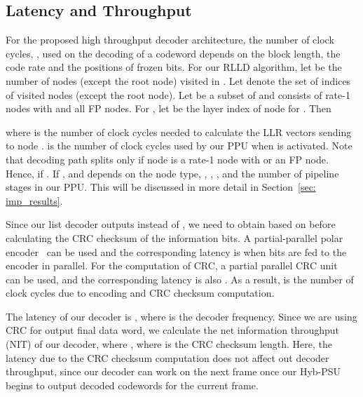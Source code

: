 \documentclass[journal]{IEEEtran}
\begin{document}
\subsection{Latency and Throughput} \label{ssec: dec_cycle}

For the proposed high throughput decoder architecture, the number of clock cycles, , used on the decoding of a codeword depends on the block length,  the code rate and the positions of frozen bits.
For our RLLD algorithm, let  be the number of nodes (except the root node) visited in . Let  denote the set of indices of visited nodes (except the root node). Let  be a subset of  and  consists of rate-1 nodes with  and all FP nodes. For , let  be the layer index of node  for .
Then

where  is the number of clock cycles needed to calculate the LLR vectors sending to node .  is the number of clock cycles used by our PPU when  is activated. Note that decoding path splits only if node  is a rate-1 node with  or an FP node. Hence,  if . If ,  and depends on the node type, , , ,  and the number of pipeline stages in our PPU. This will be discussed in more detail in Section~\ref{sec: imp_results}.

Since our list decoder outputs  instead of , we need to obtain  based on  before calculating the CRC checksum of the information bits. A partial-parallel polar encoder~\cite{polar_encoder} can be used and the corresponding latency is  when  bits are fed to the encoder in parallel. For the computation of CRC, a partial parallel CRC unit~\cite{crc_lanman2015} can be used, and the corresponding latency is also . As a result,  is the number of clock cycles due to encoding and CRC checksum computation.

The latency of our decoder is , where  is the decoder frequency. Since we are using CRC for output final data word, we calculate the net information throughput (NIT) of our decoder, where , where  is the CRC checksum length. Here, the latency due to the CRC checksum computation does not affect out decoder throughput, since our decoder can work on the next frame once our Hyb-PSU begins to output decoded codewords for the current frame.
\end{document}

